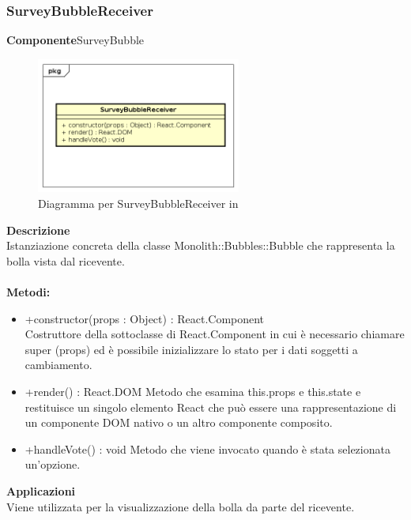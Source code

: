 \clearpage

\subsubsection{SurveyBubbleReceiver}
\textbf{Componente}SurveyBubble\\
   \FloatBarrier
   \begin{figure}[ht]
   \centering
   \includegraphics[width=0.6\textwidth]{img/single-SurveyBubbleReceiver}
   \caption{{Diagramma per SurveyBubbleReceiver in }}
\end{figure}
\FloatBarrier
\textbf{Descrizione}\\
Istanziazione concreta della classe Monolith::Bubbles::Bubble che rappresenta la bolla vista dal ricevente.
\\
\\
\textbf{Metodi:} 
\begin{itemize}
\item +constructor(props : Object) : React.Component 
\\
Costruttore della sottoclasse di React.Component in cui è necessario chiamare super (props) ed è possibile inizializzare lo stato per i dati soggetti a cambiamento.

\item +render() : React.DOM
Metodo che esamina this.props e this.state e restituisce un singolo elemento React che può essere una rappresentazione di un componente DOM nativo o un altro componente composito.

\item +handleVote() : void
Metodo che viene invocato quando è stata selezionata un'opzione. 

\end{itemize} 


\textbf{Applicazioni}\\
Viene utilizzata per la visualizzazione della bolla da parte del ricevente. 


\clearpage

